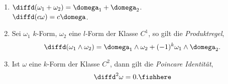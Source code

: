 \begin{prop}
\label{prop:4.40}
\begin{enumerate}[label=\arabic{*}.)]
\item $\diffd(\omega_1+\omega_2) =\domega_1+\domega_2$.\\
$\diffd(c\omega) = c\domega$.
\item Sei $\omega_1$ $k$-Form, $\omega_2$ eine $l$-Form der Klasse $C^1$, so
gilt die \emph{Produktregel},
\begin{align*}
\diffd(\omega_1\land\omega_2) = \domega_1\land \omega_2 +
(-1)^k\omega_1\land\domega_2.
\end{align*}
\item Ist $\omega$ eine $k$-Form der Klasse $C^2$, dann gilt die
\emph{Poincare Identität},
\begin{align*}
\diffd^2\omega = 0.\fishhere
\end{align*}
\end{enumerate}
\end{prop}
